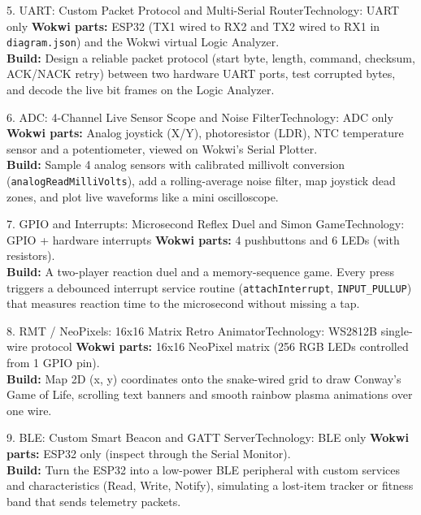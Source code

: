 \documentclass[11pt,a4paper]{article}
\begin{document}
\begin{proj}{5. UART: Custom Packet Protocol and Multi-Serial Router}{Technology: UART only}
\textbf{Wokwi parts:} ESP32 (TX1 wired to RX2 and TX2 wired to RX1 in \texttt{diagram.json}) and the Wokwi virtual Logic Analyzer.\\
\textbf{Build:} Design a reliable packet protocol (start byte, length, command, checksum, ACK/NACK retry) between two hardware UART ports, test corrupted bytes, and decode the live bit frames on the Logic Analyzer.
\end{proj}

\begin{proj}{6. ADC: 4-Channel Live Sensor Scope and Noise Filter}{Technology: ADC only}
\textbf{Wokwi parts:} Analog joystick (X/Y), photoresistor (LDR), NTC temperature sensor and a potentiometer, viewed on Wokwi's Serial Plotter.\\
\textbf{Build:} Sample 4 analog sensors with calibrated millivolt conversion (\texttt{analogReadMilliVolts}), add a rolling-average noise filter, map joystick dead zones, and plot live waveforms like a mini oscilloscope.
\end{proj}

\begin{proj}{7. GPIO and Interrupts: Microsecond Reflex Duel and Simon Game}{Technology: GPIO + hardware interrupts}
\textbf{Wokwi parts:} 4 pushbuttons and 6 LEDs (with resistors).\\
\textbf{Build:} A two-player reaction duel and a memory-sequence game. Every press triggers a debounced interrupt service routine (\texttt{attachInterrupt}, \texttt{INPUT\_PULLUP}) that measures reaction time to the microsecond without missing a tap.
\end{proj}

\begin{proj}{8. RMT / NeoPixels: 16x16 Matrix Retro Animator}{Technology: WS2812B single-wire protocol}
\textbf{Wokwi parts:} 16x16 NeoPixel matrix (256 RGB LEDs controlled from 1 GPIO pin).\\
\textbf{Build:} Map 2D (x, y) coordinates onto the snake-wired grid to draw Conway's Game of Life, scrolling text banners and smooth rainbow plasma animations over one wire.
\end{proj}

\begin{proj}{9. BLE: Custom Smart Beacon and GATT Server}{Technology: BLE only}
\textbf{Wokwi parts:} ESP32 only (inspect through the Serial Monitor).\\
\textbf{Build:} Turn the ESP32 into a low-power BLE peripheral with custom services and characteristics (Read, Write, Notify), simulating a lost-item tracker or fitness band that sends telemetry packets.
\end{proj}
\end{document}
